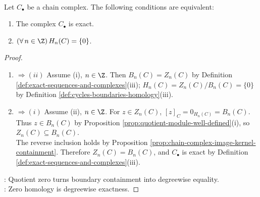 \begin{proposition} \label{prop:exact-complex-iff-zero-homology} \\
Let $C_\bullet$ be a chain complex. The following conditions are equivalent:
\begin{enumerate}[label=(\roman*)]
\setlength{\itemsep}{0pt}
\item The complex $C_\bullet$ is exact.
\item $(\forall\,n\in\Z)\,H_n(C)=\{0\}$.
\end{enumerate}
\begin{proof}
\begin{enumerate}[label=(\roman*)]
\setlength{\itemsep}{0pt}
\item[$(i)$] $\Rightarrow (ii)$ Assume (i), $n\in\Z$. Then $B_n(C)=Z_n(C)$ by Definition \ref{def:exact-sequences-and-complexes}(iii); $H_n(C)=Z_n(C)/B_n(C)=\{0\}$ by Definition \ref{def:cycles-boundaries-homology}(iii).
\item[$(ii)$] $\Rightarrow (i)$ Assume (ii), $n\in\Z$. For $z\in Z_n(C)$, $[z]_C=0_{H_n(C)}=B_n(C)$. Thus $z\in B_n(C)$ by Proposition \ref{prop:quotient-module-well-defined}(i), so $Z_n(C)\subseteq B_n(C)$.\\
The reverse inclusion holds by Proposition \ref{prop:chain-complex-image-kernel-containment}. Therefore $Z_n(C)=B_n(C)$, and $C_\bullet$ is exact by Definition \ref{def:exact-sequences-and-complexes}(iii).
\end{enumerate}
: Quotient zero turns boundary containment into degreewise equality.\\
: Zero homology is degreewise exactness.
\end{proof}
\end{proposition}

